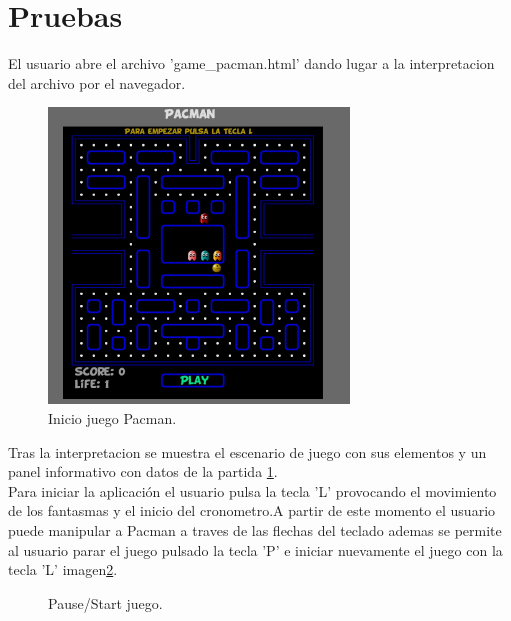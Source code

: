 \section{Pruebas}
El usuario  abre el archivo 'game\_pacman.html' dando lugar a la interpretacion del archivo por el navegador.
\begin{figure}[!h]
\centering
\includegraphics[width=80mm]{Figures/InitGame}
\decoRule
\caption[Inicio Juego]{Inicio juego Pacman.}
\label{fig:InitGame}
\end{figure}
Tras la interpretacion se muestra el escenario de juego con sus elementos y un panel informativo con datos de la partida \ref{fig:InitGame}.
\\Para iniciar la aplicación el usuario pulsa la tecla 'L'  provocando el movimiento de los fantasmas y el inicio del cronometro.A partir de este momento el usuario puede manipular a Pacman a traves de las flechas del teclado ademas se permite al usuario parar el juego pulsado la tecla 'P' e iniciar nuevamente el juego con la tecla 'L' imagen\ref{fig:Pause/Start game}.
\begin{figure}[!h]
\centering
{}\hspace{5mm}
\caption{Pause/Start juego.} \label{fig:Pause/Start game}
\end{figure}
